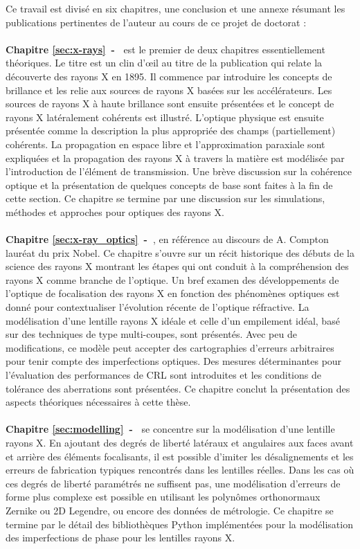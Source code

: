 Ce travail est divisé en six chapitres, une conclusion et une annexe résumant les publications pertinentes de l'auteur au cours de ce projet de doctorat :
\\
\\
\textbf{Chapitre \ref{sec:x-rays}~-~} est le premier de deux chapitres essentiellement théoriques. Le titre est un clin d’œil au titre de la publication qui relate la découverte des rayons X en 1895. Il commence par introduire les concepts de brillance et les relie aux sources de rayons X basées sur les accélérateurs. Les sources de rayons X à haute brillance sont ensuite présentées et le concept de rayons X latéralement cohérents est illustré. L’optique physique est ensuite présentée comme la description la plus appropriée des champs (partiellement) cohérents. La propagation en espace libre et l'approximation paraxiale sont expliquées et la propagation des rayons X à travers la matière est modélisée par l'introduction de l'élément de transmission. Une brève discussion sur la cohérence optique et la présentation de quelques concepts de base sont faites à la fin de cette section. Ce chapitre se termine par une discussion sur les simulations, méthodes et approches pour optiques des rayons X.
\\
\\
\textbf{Chapitre \ref{sec:x-ray_optics}~-~}, en référence au discours de A. Compton lauréat du prix Nobel. Ce chapitre s'ouvre sur un récit historique des débuts de la science des rayons X montrant les étapes qui ont conduit à la compréhension des rayons X comme branche de l'optique. Un bref examen des développements de l'optique de focalisation des rayons X en fonction des phénomènes optiques est donné pour contextualiser l'évolution récente de l'optique réfractive. La modélisation d’une lentille rayons X idéale et celle d’un empilement idéal, basé sur des techniques de type multi-coupes, sont présentés. Avec peu de modifications, ce modèle peut accepter des cartographies d'erreurs arbitraires pour tenir compte des imperfections optiques. Des mesures déterminantes pour l'évaluation des performances de CRL sont introduites et les conditions de tolérance des aberrations sont présentées. Ce chapitre conclut la présentation des aspects théoriques nécessaires à cette thèse.
\\
\\
\textbf{Chapitre \ref{sec:modelling}~-~} se concentre sur la modélisation d’une lentille rayons X. En ajoutant des degrés de liberté latéraux et angulaires aux faces avant et arrière des éléments focalisants, il est possible d’imiter les désalignements et les erreurs de fabrication typiques rencontrés dans les lentilles réelles. Dans les cas où ces degrés de liberté paramétrés ne suffisent pas, une modélisation d’erreurs de forme plus complexe est possible en utilisant les polynômes orthonormaux Zernike ou 2D Legendre, ou encore des données de métrologie. Ce chapitre se termine par le détail des bibliothèques Python implémentées pour la modélisation des imperfections de phase pour les lentilles rayons X.
